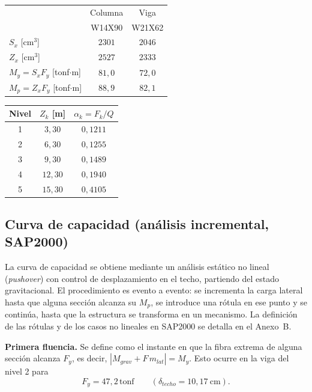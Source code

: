 \documentclass[11pt,letterpaper]{article}
\newcommand{\tonf}{\,\mathrm{tonf}}
\begin{document}
\begin{table}[H]
\centering
\begin{minipage}{0.45\textwidth}
\centering
{}
\begin{tabular}{lcc}
\toprule
 & Columna & Viga \\
 & W14X90 & W21X62 \\
\midrule
$S_x$ [cm$^3$] & $2301$ & $2046$ \\
$Z_x$ [cm$^3$] & $2527$ & $2333$ \\
$M_y = S_x F_y$ [tonf$\cdot$m] & $81{,}0$ & $72{,}0$ \\
$M_p = Z_x F_y$ [tonf$\cdot$m] & $88{,}9$ & $82{,}1$ \\
\bottomrule
\end{tabular}
\end{minipage}\hfill
\begin{minipage}{0.45\textwidth}
\centering
{}
\begin{tabular}{ccc}
\toprule
Nivel & $Z_k$ [m] & $\alpha_k = F_k/Q$ \\
\midrule
1 & $3{,}30$ & $0{,}1211$ \\
2 & $6{,}30$ & $0{,}1255$ \\
3 & $9{,}30$ & $0{,}1489$ \\
4 & $12{,}30$ & $0{,}1940$ \\
5 & $15{,}30$ & $0{,}4105$ \\
\bottomrule
\end{tabular}
\end{minipage}
\end{table}

\subsection{Curva de capacidad (análisis incremental, SAP2000)}
La curva de capacidad se obtiene mediante un análisis estático no lineal (\emph{pushover}) con control de
desplazamiento en el techo, partiendo del estado gravitacional. El procedimiento es evento a evento: se
incrementa la carga lateral hasta que alguna sección alcanza su $M_p$, se introduce una rótula en ese punto y se
continúa, hasta que la estructura se transforma en un mecanismo. La definición de las rótulas y de los casos
no lineales en SAP2000 se detalla en el Anexo~B.

\textbf{Primera fluencia.} Se define como el instante en que la fibra extrema de alguna sección alcanza $F_y$, es
decir, $|M_{grav} + F\,m_{lat}| = M_y$. Esto ocurre en la viga del nivel 2 para
\[
F_{y} = 47{,}2\tonf \qquad (\delta_{techo} = 10{,}17\ \mathrm{cm}).
\]
\end{document}
